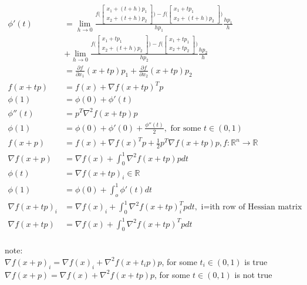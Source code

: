 \documentclass[12pt,letter]{article}
\newcommand{\R}{\mathbb{R}}
\newcommand{\p}{\partial}
\begin{document}
  \begin{align*}
    \phi'(t)
    &=\lim_{h\to 0}\frac{f\bigg(
      \begin{bmatrix}
        x_1+(t+h)p_1\\
        x_2+(t+h)p_2
      \end{bmatrix}
    \bigg)
    -f\bigg(
    \begin{bmatrix}
      x_1+tp_1\\
      x_2+(t+h)p_2
    \end{bmatrix}
    \bigg)}
    {hp_1}\frac{hp_1}{h}\\
    &+\lim_{h\to 0}\frac{f\bigg(
      \begin{bmatrix}
        x_1+tp_1\\
        x_2+(t+h)p_2
      \end{bmatrix}
    \bigg)
    -f\bigg(
    \begin{bmatrix}
      x_1+tp_1\\
      x_2+tp_2
    \end{bmatrix}
    \bigg)}
    {hp_2}\frac{hp_2}{h}\\
    &=\frac{\p f}{\p x_1}(x+tp)p_1 + \frac{\p f}{\p x_2}(x+tp)p_2\\
    f(x+tp)&=f(x) + \nabla f(x+tp)^Tp\\
    \phi(1)&=\phi(0)+\phi'(t)\\
    \phi''(t)&=p^T \nabla^2 f(x+tp)p\\
    \phi(1)&=\phi(0)+\phi'(0)+\frac{\phi''(t)}{2}, \text{ for some } t\in(0,1)\\
    f(x+p)&=f(x)+\nabla f(x)^T p + \frac{1}{2}p^T \nabla f(x+tp)p, f:\R^n\to \R\\
    \nabla f(x+p)&=\nabla f(x)+\int_0^1 \nabla^2 f(x+tp)p dt\\
    \phi(t)&=\nabla f(x+tp)_i \in \R\\
    \phi(1)&=\phi(0)+\int_o^1 \phi'(t)dt\\
    \nabla f(x+tp)_i&=\nabla f(x)_i+\int_0^1 \nabla^2 f(x+tp)_i^T p dt, \text{ i=ith row of Hessian matrix}\\
    \nabla f(x+tp)&=\nabla f(x) + \int_0^1 \nabla^2 f(x+tp)^T p dt\\
  \end{align*}

  note:\\
  $\nabla f(x+p)_i = \nabla f(x)_i + \nabla^2 f(x+t_i p)p$, for some $t_i\in(0,1)$ is true\\
  $\nabla f(x+p) = \nabla f(x) + \nabla^2 f(x+t p)p$, for some $t\in(0,1)$ is not true\\
  
\end{document}
